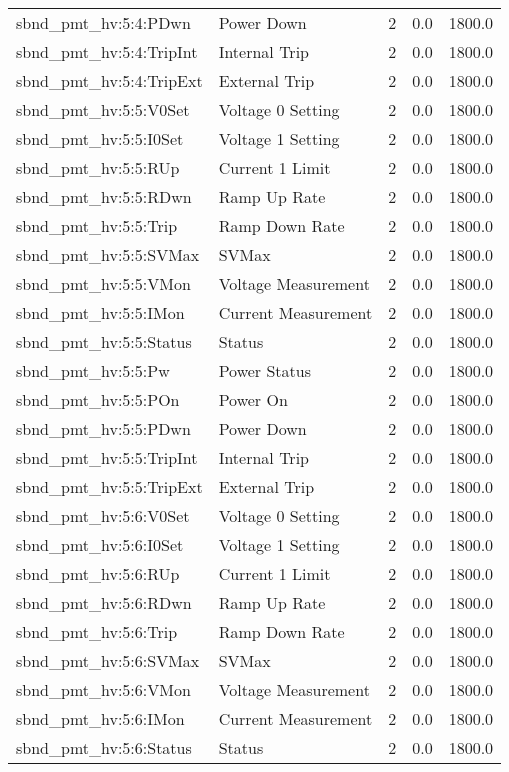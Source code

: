 \begin{center}
\begin{longtable}{l | l l l l }
sbnd\_pmt\_hv:5:4:PDwn & Power Down & 2 & 0.0 & 1800.0\\ 
sbnd\_pmt\_hv:5:4:TripInt & Internal Trip & 2 & 0.0 & 1800.0\\ 
sbnd\_pmt\_hv:5:4:TripExt & External Trip & 2 & 0.0 & 1800.0\\ 
sbnd\_pmt\_hv:5:5:V0Set & Voltage 0 Setting & 2 & 0.0 & 1800.0\\ 
sbnd\_pmt\_hv:5:5:I0Set & Voltage 1 Setting & 2 & 0.0 & 1800.0\\ 
sbnd\_pmt\_hv:5:5:RUp & Current 1 Limit & 2 & 0.0 & 1800.0\\ 
sbnd\_pmt\_hv:5:5:RDwn & Ramp Up Rate & 2 & 0.0 & 1800.0\\ 
sbnd\_pmt\_hv:5:5:Trip & Ramp Down Rate & 2 & 0.0 & 1800.0\\ 
sbnd\_pmt\_hv:5:5:SVMax & SVMax & 2 & 0.0 & 1800.0\\ 
sbnd\_pmt\_hv:5:5:VMon & Voltage Measurement & 2 & 0.0 & 1800.0\\ 
sbnd\_pmt\_hv:5:5:IMon & Current Measurement & 2 & 0.0 & 1800.0\\ 
sbnd\_pmt\_hv:5:5:Status & Status & 2 & 0.0 & 1800.0\\ 
sbnd\_pmt\_hv:5:5:Pw & Power Status & 2 & 0.0 & 1800.0\\ 
sbnd\_pmt\_hv:5:5:POn & Power On & 2 & 0.0 & 1800.0\\ 
sbnd\_pmt\_hv:5:5:PDwn & Power Down & 2 & 0.0 & 1800.0\\ 
sbnd\_pmt\_hv:5:5:TripInt & Internal Trip & 2 & 0.0 & 1800.0\\ 
sbnd\_pmt\_hv:5:5:TripExt & External Trip & 2 & 0.0 & 1800.0\\ 
sbnd\_pmt\_hv:5:6:V0Set & Voltage 0 Setting & 2 & 0.0 & 1800.0\\ 
sbnd\_pmt\_hv:5:6:I0Set & Voltage 1 Setting & 2 & 0.0 & 1800.0\\ 
sbnd\_pmt\_hv:5:6:RUp & Current 1 Limit & 2 & 0.0 & 1800.0\\ 
sbnd\_pmt\_hv:5:6:RDwn & Ramp Up Rate & 2 & 0.0 & 1800.0\\ 
sbnd\_pmt\_hv:5:6:Trip & Ramp Down Rate & 2 & 0.0 & 1800.0\\ 
sbnd\_pmt\_hv:5:6:SVMax & SVMax & 2 & 0.0 & 1800.0\\ 
sbnd\_pmt\_hv:5:6:VMon & Voltage Measurement & 2 & 0.0 & 1800.0\\ 
sbnd\_pmt\_hv:5:6:IMon & Current Measurement & 2 & 0.0 & 1800.0\\ 
sbnd\_pmt\_hv:5:6:Status & Status & 2 & 0.0 & 1800.0\\ 

\end{longtable}
\end{center}
